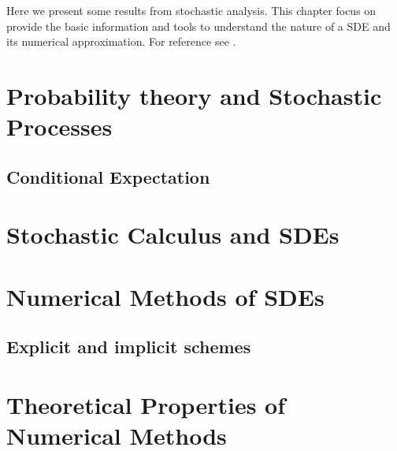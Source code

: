 	Here we present some results from stochastic analysis. This chapter focus on
provide the basic information and tools to understand the nature of a SDE and its numerical approximation. For reference
see \cite{Arnold1979, Kloeden1992, Williams1991, Milstein2004, Resnick2003}.

\section{Probability theory and Stochastic Processes}
		
		
%	
\subsection{Conditional Expectation}
		
\section{Stochastic Calculus and SDEs}
		
\section{Numerical Methods of SDEs}
	
	\subsection{Explicit and implicit schemes}
		
\section{Theoretical Properties of Numerical Methods}
		
